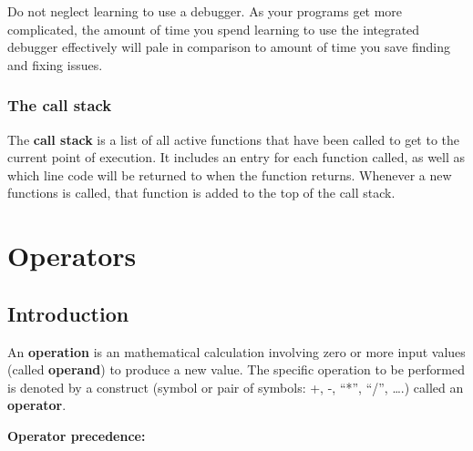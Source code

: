 \documentclass[
  letterpaper,
  DIV=11,
  numbers=noendperiod]{scrreprt}
\begin{document}
\begin{tcolorbox}[enhanced jigsaw, toprule=.15mm, rightrule=.15mm, opacityback=0, breakable, leftrule=.75mm, colback=white, colframe=quarto-callout-tip-color-frame, arc=.35mm, left=2mm, bottomrule=.15mm]
\begin{minipage}[t]{5.5mm}
\textcolor{quarto-callout-tip-color}{\faLightbulb}
\end{minipage}%
\begin{minipage}[t]{\textwidth - 5.5mm}

Do not neglect learning to use a debugger. As your programs get more
complicated, the amount of time you spend learning to use the integrated
debugger effectively will pale in comparison to amount of time you save
finding and fixing issues.

\end{minipage}%
\end{tcolorbox}

\hypertarget{the-call-stack}{%
\subsection{The call stack}\label{the-call-stack}}

The \textbf{call stack} is a list of all active functions that have been
called to get to the current point of execution. It includes an entry
for each function called, as well as which line code will be returned to
when the function returns. Whenever a new functions is called, that
function is added to the top of the call stack.


\hypertarget{operators-1}{%
\chapter{Operators}\label{operators-1}}

\hypertarget{introduction-1}{%
\section{Introduction}\label{introduction-1}}

An \textbf{operation} is an mathematical calculation involving zero or
more input values (called \textbf{operand}) to produce a new value. The
specific operation to be performed is denoted by a construct (symbol or
pair of symbols: +, -, ``*'', ``/'', \ldots.) called an
\textbf{operator}.

\textbf{Operator precedence:}
\end{document}
